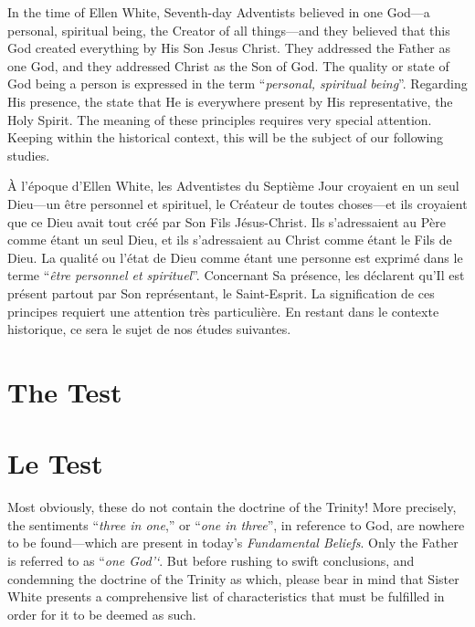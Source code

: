 In the time of Ellen White, Seventh-day Adventists believed in one God—a personal, spiritual being, the Creator of all things—and they believed that this God created everything by His Son Jesus Christ. They addressed the Father as one God, and they addressed Christ as the Son of God. The quality or state of God being a person is expressed in the term “\textit{personal, spiritual being}”. Regarding His presence, the  state that He is everywhere present by His representative, the Holy Spirit. The meaning of these principles requires very special attention. Keeping within the historical context, this will be the subject of our following studies.


À l'époque d'Ellen White, les Adventistes du Septième Jour croyaient en un seul Dieu—un être personnel et spirituel, le Créateur de toutes choses—et ils croyaient que ce Dieu avait tout créé par Son Fils Jésus-Christ. Ils s'adressaient au Père comme étant un seul Dieu, et ils s'adressaient au Christ comme étant le Fils de Dieu. La qualité ou l'état de Dieu comme étant une personne est exprimé dans le terme “\textit{être personnel et spirituel}”. Concernant Sa présence, les  déclarent qu'Il est présent partout par Son représentant, le Saint-Esprit. La signification de ces principes requiert une attention très particulière. En restant dans le contexte historique, ce sera le sujet de nos études suivantes.


\section*{The Test}


\section*{Le Test}


Most obviously, these  do not contain the doctrine of the Trinity! More precisely, the sentiments “\textit{three in one},” or “\textit{one in three}”, in reference to God, are nowhere to be found—which are present in today’s \textit{Fundamental Beliefs}. Only the Father is referred to as “\textit{one God’‘}. But before rushing to swift conclusions, and condemning the doctrine of the Trinity as which, please bear in mind that Sister White presents a comprehensive list of characteristics that must be fulfilled in order for it to be deemed as such.


